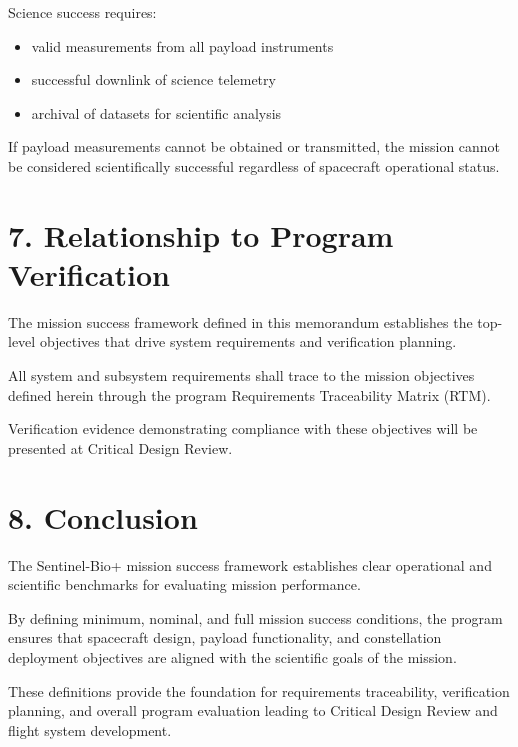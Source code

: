 \documentclass[11pt]{article}
\begin{document}
Science success requires:

\begin{itemize}

\item valid measurements from all payload instruments

\item successful downlink of science telemetry

\item archival of datasets for scientific analysis

\end{itemize}

If payload measurements cannot be obtained or transmitted, the mission cannot be considered scientifically successful regardless of spacecraft operational status.

\section*{7. Relationship to Program Verification}

The mission success framework defined in this memorandum establishes the top-level objectives that drive system requirements and verification planning.

All system and subsystem requirements shall trace to the mission objectives defined herein through the program Requirements Traceability Matrix (RTM).

Verification evidence demonstrating compliance with these objectives will be presented at Critical Design Review.

\section*{8. Conclusion}

The Sentinel-Bio+ mission success framework establishes clear operational and scientific benchmarks for evaluating mission performance.

By defining minimum, nominal, and full mission success conditions, the program ensures that spacecraft design, payload functionality, and constellation deployment objectives are aligned with the scientific goals of the mission.

These definitions provide the foundation for requirements traceability, verification planning, and overall program evaluation leading to Critical Design Review and flight system development.

\vspace{0.7cm}
\end{document}
